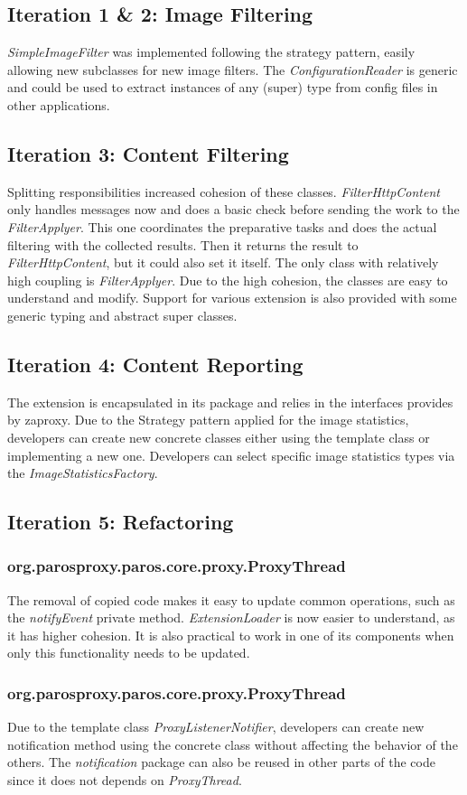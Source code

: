 \subsection{Iteration 1 \& 2: Image Filtering}
\textit{SimpleImageFilter} was implemented following the strategy pattern, easily allowing new subclasses for new image filters.
The \textit{ConfigurationReader} is generic and could be used to extract instances of any (super) type from config files in other applications.

\subsection{Iteration 3: Content Filtering}
Splitting responsibilities increased cohesion of these classes. \textit{FilterHttpContent} only handles messages now and does a basic check before sending the work to the \textit{FilterApplyer}. This one coordinates the preparative tasks and does the actual filtering with the collected results. Then it returns the result to \textit{FilterHttpContent}, but it could also set it itself.
The only class with relatively high coupling is \textit{FilterApplyer}.
Due to the high cohesion, the classes are easy to understand and modify. Support for various extension is also provided with some generic typing and abstract super classes.
\subsection{Iteration 4: Content Reporting}
The extension is encapsulated in its package and relies in the interfaces provides by zaproxy. Due to the Strategy pattern applied for the image statistics, developers can create new concrete classes either using the template class or implementing a new one. Developers can select specific image statistics types via the \textit{ImageStatisticsFactory}.

\subsection{Iteration 5: Refactoring}
\subsubsection{org.parosproxy.paros.core.proxy.ProxyThread}
The removal of copied code makes it easy to update common operations, such as the \textit{notifyEvent} private method.
\textit{ExtensionLoader} is now easier to understand, as it has higher cohesion. It is also practical to work in one of its components when only this functionality needs to be updated.
\subsubsection{org.parosproxy.paros.core.proxy.ProxyThread}

Due to the template class \textit{ProxyListenerNotifier}, developers can create new notification method using the concrete class without affecting the behavior of the others. The \textit{notification} package can also be reused in other parts of the code since it does not depends on \textit{ProxyThread}. 
